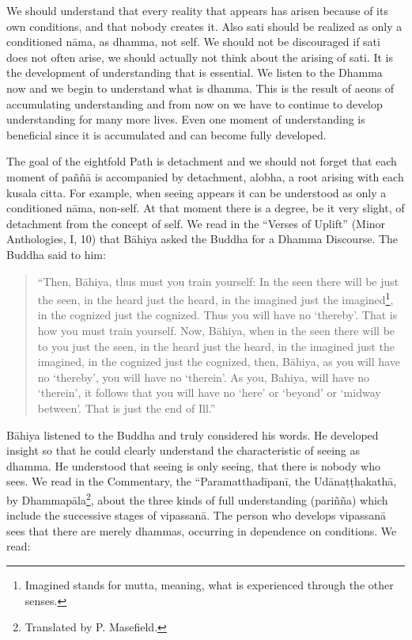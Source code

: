 We should understand that every reality that appears has arisen because of its own conditions, and that nobody creates it. Also sati should be realized as only a conditioned nāma, as dhamma, not self. We should not be discouraged if sati does not often arise, we should actually not think about the arising of sati. It is the development of understanding that is essential. We listen to the Dhamma now and we begin to understand what is dhamma. This is the result of aeons of accumulating understanding and from now on we have to continue to develop understanding for many more lives. Even one moment of understanding is beneficial since it is accumulated and can become fully developed.

The goal of the eightfold Path is detachment and we should not forget that each moment of paññā is accompanied by detachment, alobha, a root arising with each kusala citta. For example, when seeing appears it can be understood as only a conditioned nāma, non-self. At that moment there is a degree, be it very slight, of detachment from the concept of self. We read in the ``Verses of Uplift'' (Minor Anthologies, I, 10) that Bāhiya asked the Buddha for a Dhamma Discourse. The Buddha said to him:

\begin{quote}
``Then, Bāhiya, thus must you train yourself: In the seen there will be just the seen, in the heard just the heard, in the imagined just the imagined\footnote{Imagined stands for mutta, meaning, what is experienced through the other senses.}, in the cognized just the cognized. Thus you will have no ‘thereby’. That is how you must train yourself. Now, Bāhiya, when in the seen there will be to you just the seen, in the heard just the heard, in the imagined just the imagined, in the cognized just the cognized, then, Bāhiya, as you will have no ‘thereby’, you will have no ‘therein’. As you, Bahiya, will have no ‘therein’, it follows that you will have no ‘here’ or ‘beyond’ or ‘midway between’. That is just the end of Ill.''
\end{quote}

Bāhiya listened to the Buddha and truly considered his words. He developed insight so that he could clearly understand the characteristic of seeing as dhamma. He understood that seeing is only seeing, that there is nobody who sees.
We read in the Commentary, the ``Paramatthadīpanī, the Udānaṭṭhakathā, by Dhammapāla\footnote{Translated by P. Masefield.}, about the three kinds of full understanding (pariñña) which include the successive stages of vipassanā. The person who develops vipassanā sees that there are merely dhammas, occurring in dependence on conditions. We read:

